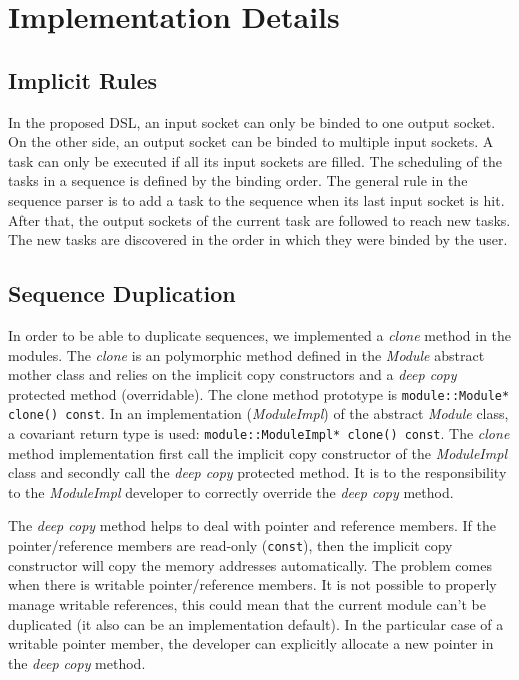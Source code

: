 \section{Implementation Details}

\subsection{Implicit Rules}

In the proposed DSL, an input socket can only be binded to one output socket.
On the other side, an output socket can be binded to multiple input sockets.
A task can only be executed if all its input sockets are filled. The scheduling
of the tasks in a sequence is defined by the binding order. The general rule
in the sequence parser is to add a task to the sequence when its last input
socket is hit. After that, the output sockets of the current task are followed
to reach new tasks. The new tasks are discovered in the order in which they were
binded by the user.

\subsection{Sequence Duplication}

In order to be able to duplicate sequences, we implemented a \emph{clone} method
in the modules. The \emph{clone} is an polymorphic method defined in the
\emph{Module} abstract mother class and relies on the implicit copy constructors
and a \emph{deep copy} protected method (overridable). The clone method
prototype is \verb|module::Module* clone() const|. In an implementation
(\emph{ModuleImpl}) of the abstract \emph{Module} class, a covariant return type
is used: \verb|module::ModuleImpl* clone() const|. The \emph{clone} method
implementation first call the implicit copy constructor of the \emph{ModuleImpl}
class and secondly call the \emph{deep copy} protected method. It is to the
responsibility to the \emph{ModuleImpl} developer to correctly override the
\emph{deep copy} method.

The \emph{deep copy} method helps to deal with pointer and reference members.
If the pointer/reference members are read-only (\verb|const|), then the implicit
copy constructor will copy the memory addresses automatically. The problem comes
when there is writable pointer/reference members. It is not possible to properly
manage writable references, this could mean that the current module can't be
duplicated (it also can be an implementation default). In the particular case of
a writable pointer member, the developer can explicitly allocate a new pointer
in the \emph{deep copy} method.

